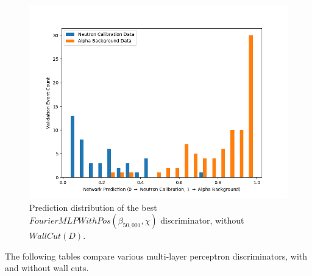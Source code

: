 \documentclass[10pt]{article}
\begin{document}
\begin{figure}[H]
    \centering
    \includegraphics[width=\textwidth]{high_freq_no_wall_hist}
    \caption{\label{high_freq_no_wall_hist} Prediction distribution of the best $FourierMLPWithPos(\beta_{50,001}, \chi)$ discriminator, without $WallCut(D)$.}
\end{figure}

The following tables compare various multi-layer perceptron discriminators, with and without wall cuts.
\end{document}
